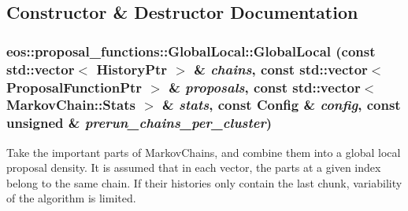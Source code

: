 \subsection{Constructor \& Destructor Documentation}
\hypertarget{classeos_1_1proposal__functions_1_1GlobalLocal_a09da326841b33c72b086dc04d9ba0c4a}{
\subsubsection[{GlobalLocal}]{\setlength{\rightskip}{0pt plus 5cm}eos::proposal\_\-functions::GlobalLocal::GlobalLocal (const std::vector$<$ {\bf HistoryPtr} $>$ \& {\em chains}, \/  const std::vector$<$ {\bf ProposalFunctionPtr} $>$ \& {\em proposals}, \/  const std::vector$<$ {\bf MarkovChain::Stats} $>$ \& {\em stats}, \/  const {\bf Config} \& {\em config}, \/  const unsigned \& {\em prerun\_\-chains\_\-per\_\-cluster})}}
\label{classeos_1_1proposal__functions_1_1GlobalLocal_a09da326841b33c72b086dc04d9ba0c4a}
Take the important parts of MarkovChains, and combine them into a global local proposal density. It is assumed that in each vector, the parts at a given index belong to the same chain. If their histories only contain the last chunk, variability of the algorithm is limited.

